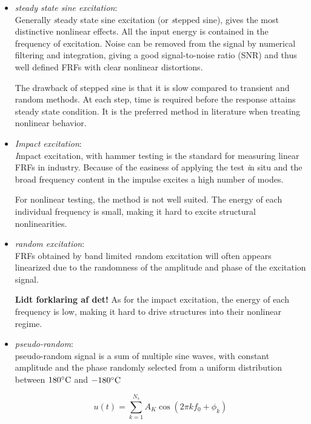 \begin{itemize}
\item \textit{steady state sine excitation}:\\
  Generally {\textit steady state sine excitation} (or {\textit stepped sine}), gives
  the most distinctive nonlinear effects. All the input energy is contained in
  the frequency of excitation. Noise can be removed from the signal by numerical
  filtering and integration, giving a good signal-to-noise ratio (SNR) and thus well
  defined FRFs with clear nonlinear distortions.
  
  The drawback of stepped sine is that it is slow compared to transient and
  random methods. At each step, time is required before the response attains
  steady state condition. It is the preferred method in literature when treating
  nonlinear behavior.

\item \textit{Impact excitation}:\\
  {\textit Impact excitation}, with hammer testing is the standard for measuring
  linear FRFs in industry. Because of the easiness of applying the test {\textit in
    situ} and the broad frequency content in the impulse excites a high number
  of modes.

  For nonlinear testing, the method is not well suited. The energy of each
  individual frequency is small, making it hard to excite structural
  nonlinearities.

\item \textit{random excitation}:\\
  FRFs obtained by band limited {\textit random excitation} will often appears
  linearized due to the randomness of the amplitude and phase of the excitation
  signal.

  \textbf{Lidt forklaring af det!} As for the impact excitation, the energy of
  each frequency is low, making it hard to drive structures into their nonlinear
  regime.

\item \textit{pseudo-random}:\\
  pseudo-random signal is a sum of multiple sine waves, with constant amplitude
  and the phase randomly selected from a uniform distribution between $180
  ^\circ \mathrm{C}$ and $-180 ^\circ \mathrm{C}$

  \begin{equation}
    \label{eq:multiple-sine}
    u(t) = \sum_{k=1}^{N_s} A_K \cos \left( 2 \pi k f_0 + \phi_k \right)
  \end{equation}


\end{itemize}
